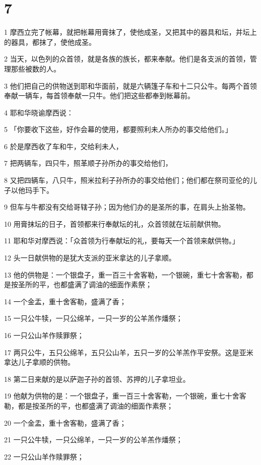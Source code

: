\chapter{7}

\par 1 摩西立完了帐幕，就把帐幕用膏抹了，使他成圣，又把其中的器具和坛，并坛上的器具，都抹了，使他成圣。
\par 2 当天，以色列的众首领，就是各族的族长，都来奉献。他们是各支派的首领，管理那些被数的人。
\par 3 他们把自己的供物送到耶和华面前，就是六辆篷子车和十二只公牛。每两个首领奉献一辆车，每首领奉献一只牛。他们把这些都奉到帐幕前。
\par 4 耶和华晓谕摩西说：
\par 5 「你要收下这些，好作会幕的使用，都要照利未人所办的事交给他们。」
\par 6 於是摩西收了车和牛，交给利未人，
\par 7 把两辆车，四只牛，照革顺子孙所办的事交给他们，
\par 8 又把四辆车，八只牛，照米拉利子孙所办的事交给他们；他们都在祭司亚伦的儿子以他玛手下。
\par 9 但车与牛都没有交给哥辖子孙；因为他们办的是圣所的事，在肩头上抬圣物。
\par 10 用膏抹坛的日子，首领都来行奉献坛的礼，众首领就在坛前献供物。
\par 11 耶和华对摩西说：「众首领为行奉献坛的礼，要每天一个首领来献供物。」
\par 12 头一日献供物的是犹大支派的亚米拿达的儿子拿顺。
\par 13 他的供物是：一个银盘子，重一百三十舍客勒，一个银碗，重七十舍客勒，都是按圣所的平，也都盛满了调油的细面作素祭；
\par 14 一个金盂，重十舍客勒，盛满了香；
\par 15 一只公牛犊，一只公绵羊，一只一岁的公羊羔作燔祭；
\par 16 一只公山羊作赎罪祭；
\par 17 两只公牛，五只公绵羊，五只公山羊，五只一岁的公羊羔作平安祭。这是亚米拿达儿子拿顺的供物。
\par 18 第二日来献的是以萨迦子孙的首领、苏押的儿子拿坦业。
\par 19 他献为供物的是：一个银盘子，重一百三十舍客勒，一个银碗，重七十舍客勒，都是按圣所的平，也都盛满了调油的细面作素祭；
\par 20 一个金盂，重十舍客勒，盛满了香；
\par 21 一只公牛犊，一只公绵羊，一只一岁的公羊羔作燔祭；
\par 22 一只公山羊作赎罪祭；
